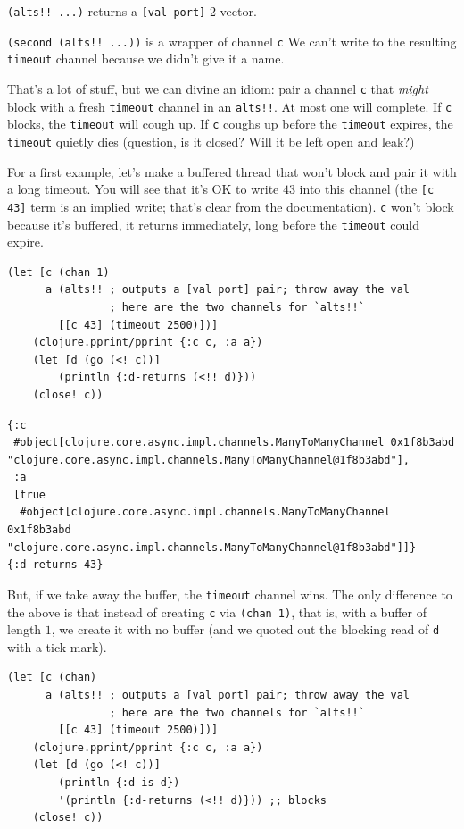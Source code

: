 \documentclass[10pt,oneside,x11names]{article}
\begin{document}
\texttt{(alts!! ...)} returns a \texttt{[val port]} 2-vector.

\texttt{(second (alts!! ...))} is a wrapper of channel \texttt{c} We can't write to
the resulting \texttt{timeout} channel because we didn't give it a name.

That's a lot of stuff, but we can divine an idiom: pair a channel \texttt{c}
that \emph{might} block with a fresh \texttt{timeout} channel in an \texttt{alts!!}. At
most one will complete. If \texttt{c} blocks, the \texttt{timeout} will cough up. If
\texttt{c} coughs up before the \texttt{timeout} expires, the \texttt{timeout} quietly dies
(question, is it closed? Will it be left open and leak?)

For a first example, let's make a buffered thread that won't block and
pair it with a long timeout. You will see that it's OK to write \(43\)
into this channel (the \texttt{[c 43]} term is an implied write; that's clear
from the documentation). \texttt{c} won't block because it's buffered, it
returns immediately, long before the \texttt{timeout} could expire.

\begin{verbatim}
(let [c (chan 1)
      a (alts!! ; outputs a [val port] pair; throw away the val
                ; here are the two channels for `alts!!`
        [[c 43] (timeout 2500)])]
    (clojure.pprint/pprint {:c c, :a a})
    (let [d (go (<! c))]
        (println {:d-returns (<!! d)}))
    (close! c))
\end{verbatim}

\begin{verbatim}
{:c
 #object[clojure.core.async.impl.channels.ManyToManyChannel 0x1f8b3abd "clojure.core.async.impl.channels.ManyToManyChannel@1f8b3abd"],
 :a
 [true
  #object[clojure.core.async.impl.channels.ManyToManyChannel 0x1f8b3abd "clojure.core.async.impl.channels.ManyToManyChannel@1f8b3abd"]]}
{:d-returns 43}
\end{verbatim}


But, if we take away the buffer, the \texttt{timeout} channel wins. The only
difference to the above is that instead of creating \texttt{c} via \texttt{(chan 1)},
that is, with a buffer of length \(1\), we create it with no buffer (and
we quoted out the blocking read of \texttt{d} with a tick mark).

\begin{verbatim}
(let [c (chan)
      a (alts!! ; outputs a [val port] pair; throw away the val
                ; here are the two channels for `alts!!`
        [[c 43] (timeout 2500)])]
    (clojure.pprint/pprint {:c c, :a a})
    (let [d (go (<! c))]
        (println {:d-is d})
        '(println {:d-returns (<!! d)})) ;; blocks
    (close! c))
\end{verbatim}
\end{document}

